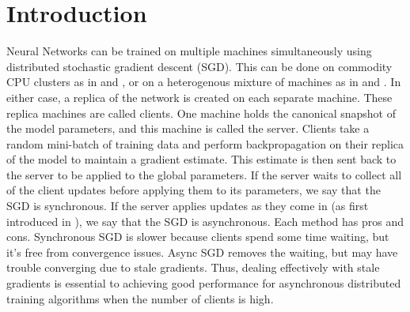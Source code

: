 \documentclass{article} %
\title{\scalebox{1}{Faster Asynchronous SGD}}
\author{
\hspace{14mm} Augustus Odena \\
\hspace{3mm} \texttt{augustus.odena@gmail.com}
}
\begin{document}
\begin{center}
\maketitle
\end{center}

\begin{abstract}

Asynchronous distributed stochastic gradient descent methods have trouble converging because of stale gradients.
A gradient update sent to a parameter server by a client is stale if the parameters used to calculate that gradient have since been updated on the server.
Approaches have been proposed to circumvent this problem that quantify staleness in terms of the number of elapsed updates.
In this work, we propose a novel method that quantifies staleness in terms of moving averages of gradient statistics.
We show that this method outperforms previous methods with respect to convergence speed and scalability to many clients.
We also discuss how an extension to this method can be used to dramatically reduce bandwidth costs
in a distributed training context.
In particular, our method allows reduction of total bandwidth usage by a factor of 5 with little impact on
cost convergence.
We also describe (and link to) a software library that we have used to simulate these algorithms
deterministically on a single machine.

\end{abstract}

\section{Introduction}

Neural Networks can be trained on multiple machines simultaneously using distributed stochastic gradient descent (SGD).
This can be done on commodity CPU clusters as in \cite{Dean} and \cite{ADAM},
or on a heterogenous mixture of machines as in \cite{ONEBIT} and \cite{Wu}.
In either case, a replica of the network is created on each separate machine. These replica machines are called clients.
One machine holds the canonical snapshot of the model parameters, and this machine is called the server.
Clients take a random mini-batch of training data and perform backpropagation on their replica of the model to maintain a gradient estimate.
This estimate is then sent back to the server to be applied to the global parameters.
If the server waits to collect all of the client updates before applying them to its parameters, we say that the SGD is synchronous.
If the server applies updates as they come in (as first introduced in \cite{FirstASGD}), we say that the SGD is asynchronous.
Each method has pros and cons.
Synchronous SGD is slower because clients spend some time waiting, but it's free from convergence issues.
Async SGD removes the waiting, but may have trouble converging due to stale gradients.
Thus, dealing effectively with stale gradients is essential to achieving good performance
for asynchronous distributed training algorithms when the number of clients is high.
\end{document}

